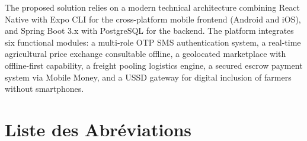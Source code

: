 \documentclass[12pt,a4paper]{report}
\begin{document}
The proposed solution relies on a modern technical architecture combining React Native with Expo CLI for the cross-platform mobile frontend (Android and iOS), and Spring Boot 3.x with PostgreSQL for the backend. The platform integrates six functional modules: a multi-role OTP SMS authentication system, a real-time agricultural price exchange consultable offline, a geolocated marketplace with offline-first capability, a freight pooling logistics engine, a secured escrow payment system via Mobile Money, and a USSD gateway for digital inclusion of farmers without smartphones.

\chapter*{Liste des Abréviations}
\end{document}
